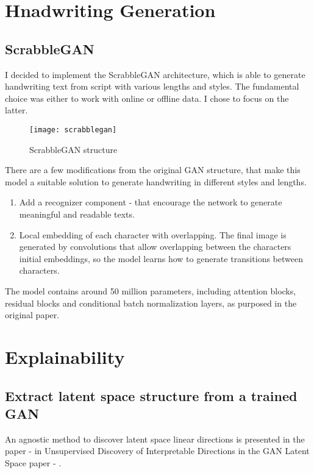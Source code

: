\section{Hnadwriting Generation}


\subsection{ScrabbleGAN}

I decided to implement the ScrabbleGAN \cite{ScrabbleGAN} architecture, which is able to generate handwriting text from script with various lengths and styles. The fundamental choice was either to work with online or offline data. I chose to focus on the latter. 


\begin{figure}[h]
\centering
\texttt{[image: scrabblegan]}
\caption{ScrabbleGAN structure}
\label{fig:x cubed graph}
\end{figure}

There are a few modifications from the original GAN structure, that make this model a suitable solution to generate handwriting in different styles and lengths.


\begin{enumerate} 
 	\item Add a recognizer component - that encourage the network to generate meaningful and readable texts. 
 	\item Local embedding of each character with overlapping. The final image is generated by convolutions that allow overlapping between the characters initial embeddings, so the model learns how to generate transitions between characters. 
\end{enumerate} 

The model contains around 50 million parameters, including attention blocks, residual blocks and conditional batch normalization layers, as purposed in the original paper.


\section{Explainability}


\subsection{Extract latent space structure from a trained GAN}

An agnostic method to discover latent space linear directions is presented in the paper - 
in Unsupervised Discovery of Interpretable Directions in the GAN Latent Space paper - \cite{10}.

